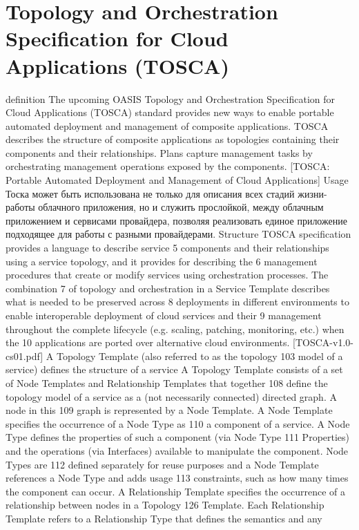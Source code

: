 \section{Topology and Orchestration Specification for Cloud	Applications (TOSCA)}
definition
The upcoming OASIS Topology and Orchestration Specification for
Cloud Applications (TOSCA) standard provides new ways to enable portable automated
deployment and management of composite applications. TOSCA describes the
structure of composite applications as topologies containing their components and
their relationships. Plans capture management tasks by orchestrating management
operations exposed by the components.
[TOSCA: Portable Automated Deployment and Management of Cloud Applications]
Usage
Тоска может быть использована не только для описания всех стадий жизни- работы облачного приложения, но и служить прослойкой, между облачным приложением и сервисами провайдера, позволяя реализовать единое приложение подходящее для работы с разными провайдерами. 
\fi 
Structure
TOSCA specification provides a language to describe service
5 components and their relationships using a service topology, and it provides for describing the
6 management procedures that create or modify services using orchestration processes. The combination
7 of topology and orchestration in a Service Template describes what is needed to be preserved across
8 deployments in different environments to enable interoperable deployment of cloud services and their
9 management throughout the complete lifecycle (e.g. scaling, patching, monitoring, etc.) when the
10 applications are ported over alternative cloud environments.
[TOSCA-v1.0-cs01.pdf]
 A Topology Template (also referred to as the topology
103 model of a service) defines the structure of a service
A Topology Template consists of a set of Node Templates and Relationship Templates that together
108 define the topology model of a service as a (not necessarily connected) directed graph. A node in this
109 graph is represented by a Node Template. A Node Template specifies the occurrence of a Node Type as
110 a component of a service. A Node Type defines the properties of such a component (via Node Type
111 Properties) and the operations (via Interfaces) available to manipulate the component. Node Types are
112 defined separately for reuse purposes and a Node Template references a Node Type and adds usage
113 constraints, such as how many times the component can occur.
A Relationship Template specifies the occurrence of a relationship between nodes in a Topology
126 Template. Each Relationship Template refers to a Relationship Type that defines the semantics and any
